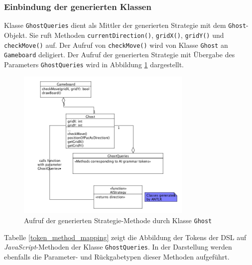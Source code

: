 \documentclass[conference]{IEEEtran}
\begin{document}
\subsubsection{Einbindung der generierten Klassen}

Klasse \texttt{GhostQueries} dient als Mittler der generierten Strategie mit dem \texttt{Ghost}-Objekt. Sie ruft Methoden \texttt{currentDirection()}, \texttt{gridX()}, \texttt{gridY()} und \texttt{checkMove()} auf. Der Aufruf von \texttt{checkMove()} wird von Klasse \texttt{Ghost} an \texttt{Gameboard} deligiert.
Der Aufruf der generierten Strategie mit Übergabe des Parameters \texttt{GhostQueries} wird in Abbildung \ref{ai_call} dargestellt.

\begin{figure}[!htb]
\centering
\includegraphics[width=3.3in]{queries.png}
\caption{Aufruf der generierten Strategie-Methode durch Klasse \texttt{Ghost}}
\label{ai_call}
\end{figure}

Tabelle \ref{token_method_mapping} zeigt die Abbildung der Tokens der DSL auf \emph{JavaScript}-Methoden der Klasse \texttt{GhostQueries}. In der Darstellung werden ebenfalls die Parameter- und Rückgabetypen dieser Methoden aufgeführt.
\end{document}
